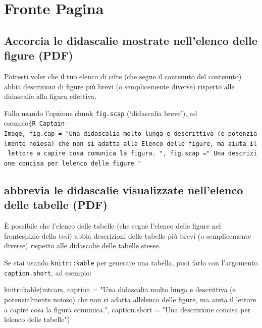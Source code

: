 \documentclass[a4paper, 11pt, nobind]{templates/ociamthesis}
\newenvironment{Shaded}{\begin{snugshade}}{\end{snugshade}}
\newcommand{\AttributeTok}[1]{\textcolor[rgb]{0.77,0.63,0.00}{#1}}
\newcommand{\FunctionTok}[1]{\textcolor[rgb]{0.00,0.00,0.00}{#1}}
\newcommand{\NormalTok}[1]{#1}
\newcommand{\SpecialCharTok}[1]{\textcolor[rgb]{0.00,0.00,0.00}{#1}}
\newcommand{\StringTok}[1]{\textcolor[rgb]{0.31,0.60,0.02}{#1}}
\renewenvironment{Shaded}
{
  \vspace{10pt}%
  \begin{snugshade}%
}{%
  \end{snugshade}%
  \vspace{8pt}%
}
\begin{document}
\hypertarget{fronte-pagina}{%
\section{Fronte Pagina}\label{fronte-pagina}}

\hypertarget{accorcia-le-didascalie-mostrate-nellelenco-delle-figure-pdf}{%
\subsection{Accorcia le didascalie mostrate nell'elenco delle figure (PDF)}\label{accorcia-le-didascalie-mostrate-nellelenco-delle-figure-pdf}}

Potresti voler che il tuo elenco di cifre (che segue il contenuto del contenuto) abbia descrizioni di figure più brevi (o semplicemente diverse) rispetto alle didascalie alla figura effettiva.

Fallo usando l'opzione chunk \texttt{fig.scap} (`didascalia breve'), ad esempio\texttt{\{R\ Captain-Image,\ fig.cap\ =\ "Una\ didascalia\ molto\ lunga\ e\ descrittiva\ (e\ potenzialmente\ noiosa)\ che\ non\ si\ adatta\ alla\ Elenco\ delle\ figure,\ ma\ aiuta\ il\ lettore\ a\ capire\ cosa\ comunica\ la\ figura.\ ",\ fig.scap\ ="\ Una\ descrizione\ concisa\ per\ l\textquotesingle{}elenco\ delle\ figure\ "}

\hypertarget{abbrevia-le-didascalie-visualizzate-nellelenco-delle-tabelle-pdf}{%
\subsection{abbrevia le didascalie visualizzate nell'elenco delle tabelle (PDF)}\label{abbrevia-le-didascalie-visualizzate-nellelenco-delle-tabelle-pdf}}

È possibile che l'elenco delle tabelle (che segue l'elenco delle figure nel frontespizio della tesi) abbia descrizioni delle tabelle più brevi (o semplicemente diverse) rispetto alle didascalie delle tabelle stesse.

Se stai usando \texttt{knitr::kable} per generare una tabella, puoi farlo con l'argomento \texttt{caption.short}, ad esempio:

\begin{Shaded}
\begin{Highlighting}[]
\NormalTok{knitr}\SpecialCharTok{::}\FunctionTok{kable}\NormalTok{(mtcars,}
              \AttributeTok{caption =} \StringTok{"Una didascalia molto lunga e descrittiva (e potenzialmente}
\StringTok{               noioso) che non si adatta all\textquotesingle{}elenco delle figure,}
\StringTok{               ma aiuta il lettore a capire cosa la figura}
\StringTok{               comunica."}\NormalTok{,}
              \AttributeTok{caption.short =} \StringTok{"Una descrizione concisa per l\textquotesingle{}elenco delle tabelle"}\NormalTok{)}
\end{Highlighting}
\end{Shaded}
\end{document}

